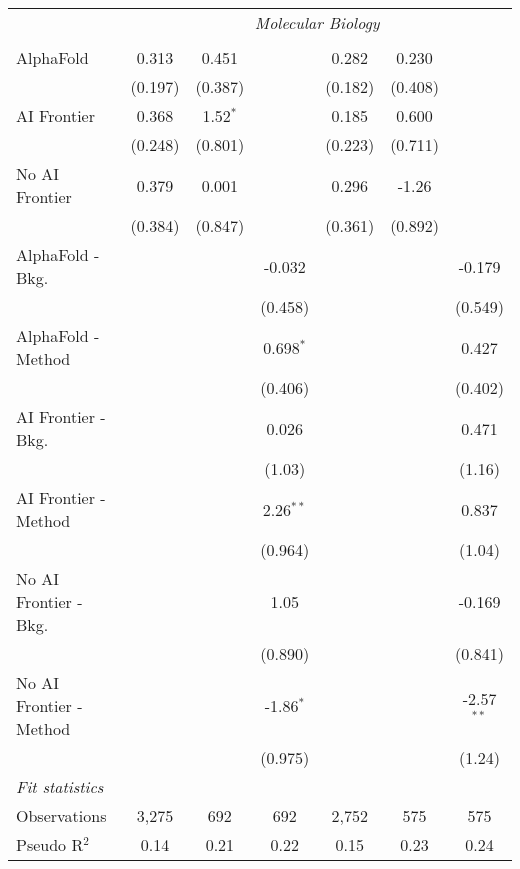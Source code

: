 \begin{tabular}{lcccccc}
 & \multicolumn{6}{c}{\textit{Molecular Biology}} \\ \\
   AlphaFold               & 0.313   & 0.451      &             & 0.282   & 0.230   &   \\   
                           & (0.197) & (0.387)    &             & (0.182) & (0.408) &   \\   
   AI Frontier             & 0.368   & 1.52$^{*}$ &             & 0.185   & 0.600   &   \\   
                           & (0.248) & (0.801)    &             & (0.223) & (0.711) &   \\   
   No AI Frontier          & 0.379   & 0.001      &             & 0.296   & -1.26   &   \\   
                           & (0.384) & (0.847)    &             & (0.361) & (0.892) &   \\   
   AlphaFold - Bkg.        &         &            & -0.032      &         &         & -0.179\\   
                           &         &            & (0.458)     &         &         & (0.549)\\   
   AlphaFold - Method      &         &            & 0.698$^{*}$ &         &         & 0.427\\   
                           &         &            & (0.406)     &         &         & (0.402)\\   
   AI Frontier - Bkg.      &         &            & 0.026       &         &         & 0.471\\   
                           &         &            & (1.03)      &         &         & (1.16)\\   
   AI Frontier - Method    &         &            & 2.26$^{**}$ &         &         & 0.837\\   
                           &         &            & (0.964)     &         &         & (1.04)\\   
   No AI Frontier - Bkg.   &         &            & 1.05        &         &         & -0.169\\   
                           &         &            & (0.890)     &         &         & (0.841)\\   
   No AI Frontier - Method &         &            & -1.86$^{*}$ &         &         & -2.57$^{**}$\\   
                           &         &            & (0.975)     &         &         & (1.24)\\   
   \midrule
   \emph{Fit statistics}\\
   Observations            & 3,275   & 692        & 692         & 2,752   & 575     & 575\\  
   Pseudo R$^2$            & 0.14    & 0.21       & 0.22        & 0.15    & 0.23    & 0.24\\  
   

\end{tabular}

